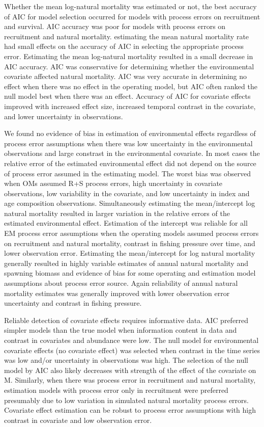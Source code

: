 \documentclass[
  12pt,
]{article}
\begin{document}
Whether the mean log-natural mortality was estimated or not, the best
accuracy of AIC for model selection occurred for models with process
errors on recruitment and survival. AIC accuracy was poor for models
with process errors on recruitment and natural mortality. estimating the
mean natural mortality rate had small effects on the accuracy of AIC in
selecting the appropriate process error. Estimating the mean log-natural
mortality resulted in a small decrease in AIC accuracy. AIC was
conservative for determining whether the environmental covariate
affected natural mortality. AIC was very accurate in determining no
effect when there was no effect in the operating model, but AIC often
ranked the null model best when there was an effect. Accuracy of AIC for
covariate effects improved with increased effect size, increased
temporal contrast in the covariate, and lower uncertainty in
observations.

We found no evidence of bias in estimation of environmental effects
regardless of process error assumptions when there was low uncertainty
in the environmental observations and large constrast in the
environmental covariate. In most cases the relative error of the
estimated environmental effect did not depend on the source of process
error assumed in the estimating model. The worst bias was observed when
OMs assumed R+S process errors, high uncertainty in covariate
observations, low variability in the covariate, and low uncertainty in
index and age composition observations. Simultaneously estimating the
mean/intercept log natural mortality resulted in larger variation in the
relative errors of the estimated environmental effect. Estimation of the
intercept was reliable for all EM process error assumptions when the
operating models assumed process errors on recruitment and natural
mortality, contrast in fishing pressure over time, and lower observation
error. Estimating the mean/intercept for log natural mortality generally
resulted in highly variable estimates of annual natural mortality and
spawning biomass and evidence of bias for some operating and estimation
model assumptions about process error source. Again reliability of
annual natural mortality estimates was generally improved with lower
observation error uncertainty and contrast in fishing pressure.

Reliable detection of covariate effects requires informative data. AIC
preferred simpler models than the true model when information content in
data and contrast in covariates and abundance were low. The null model
for environmental covariate effects (no covariate effect) was selected
when contrast in the time series was low and/or uncertainty in
observations was high. The selection of the null model by AIC also
likely decreases with strength of the effect of the covariate on M.
Similarly, when there was process error in recruitment and natural
mortality, estimation models with process error only in recruitment were
preferred presumably due to low variation in simulated natural mortality
process errors. Covariate effect estimation can be robust to process
error assumptions with high contrast in covariate and low observation
error.
\end{document}
